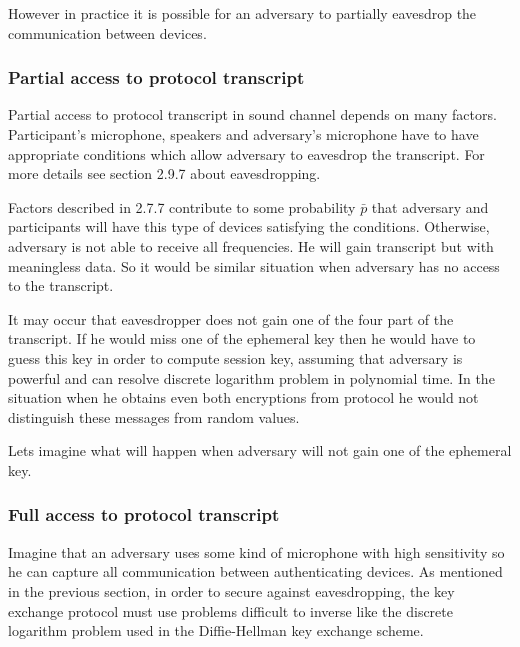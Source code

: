 \documentclass[11pt,titlepage]{article}
\theoremstyle{plain}
\begin{document}
\vspace{5mm}

However in practice it is possible for an adversary to partially eavesdrop the communication between devices.

\subsubsection{Partial access to protocol transcript}

Partial access to protocol transcript in sound channel depends on many factors. Participant's microphone, speakers and adversary's microphone have to have appropriate conditions which allow adversary to eavesdrop the transcript. For more details see section 2.9.7 about eavesdropping.

\vspace{5mm}

Factors described in 2.7.7 contribute to some probability $\bar{p}$ that adversary and participants will have this type of devices satisfying the conditions. Otherwise, adversary is not able to receive all frequencies. He will gain transcript but with meaningless data. So it would be similar situation when adversary has no access to the transcript.  

\vspace{5mm}

It may occur that eavesdropper does not gain one of the four part of the transcript. If he would miss one of the ephemeral key then he would have to guess this key in order to compute session key, assuming that adversary is powerful and can resolve discrete logarithm problem in polynomial time. In the situation when he obtains even both encryptions from protocol he would not distinguish these messages from random values. 

\vspace{5mm}

Lets imagine what will happen when adversary will not gain one of the ephemeral key.
\subsubsection{Full access to protocol transcript}
Imagine that an adversary uses some kind of microphone with high sensitivity so he can capture all communication between authenticating devices. As mentioned in the previous section, in order to secure against eavesdropping, the key exchange protocol must use problems difficult to inverse like the discrete logarithm problem used in the Diffie-Hellman key exchange scheme.
\end{document}

